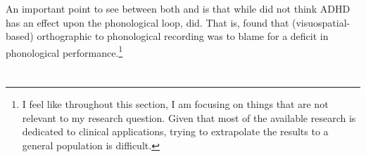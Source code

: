 \documentclass[stu]{apa7}
\begin{document}
\begin{enumerate}
	An important point to see between both \textcite{raiker_phonological_2019} and \textcite{kofler_working_2020} is that while \textcite{kofler_working_2020} did not think ADHD has an effect upon the phonological loop, \textcite{raiker_phonological_2019} did. That is, \textcite{raiker_phonological_2019} found that (visuospatial-based) orthographic to phonological recording was to blame for a deficit in phonological performance.\footnote{I feel like throughout this section, I am focusing on things that are not relevant to my research question. Given that most of the available research is dedicated to clinical applications, trying to extrapolate the results to a general population is difficult.}
\end{enumerate}

\section{}




\printbibliography
\end{document}
